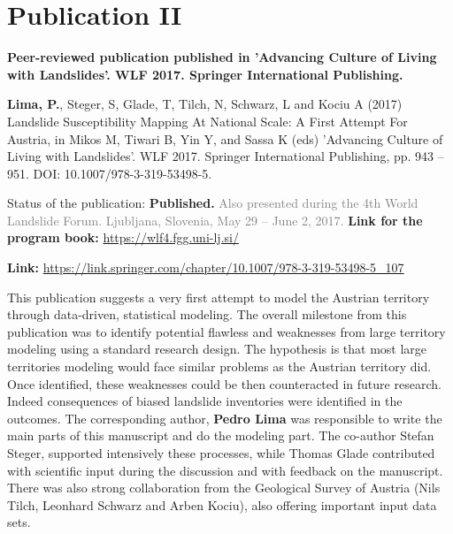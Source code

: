 \chapter{Publication II}\label{public_II} 
\textbf{Peer-reviewed publication published in 'Advancing Culture of Living with Landslides'. WLF 2017. Springer International Publishing.}
\vspace{5mm} %

\textbf{Lima, P.}, Steger, S, Glade, T, Tilch, N, Schwarz, L and Kociu A (2017) Landslide Susceptibility Mapping At National Scale: A First Attempt For Austria, in  Mikos M, Tiwari B, Yin Y, and Sassa K (eds) 'Advancing Culture of Living with Landslides'. WLF 2017. Springer International Publishing, pp. 943 – 951. DOI: 10.1007/978-3-319-53498-5. 

\vspace{5mm} %

Status of the publication: \textbf{Published.} \textcolor{gray}{Also presented during the 4th World Landslide Forum. Ljubljana, Slovenia, May 29 – June 2, 2017.} \textbf{Link for the program book:} \href{https://wlf4.fgg.uni-lj.si/wp-content/uploads/2017/05/WLF4-Local-Proceedings-and-Programme-with-posters.pdf}{https://wlf4.fgg.uni-lj.si/}\par
\vspace{5mm} %
\textbf{Link:} \href{https://link.springer.com/chapter/10.1007/978-3-319-53498-5_107}{https://link.springer.com/chapter/10.1007/978-3-319-53498-5_107} \par

\vspace{5mm} %
This publication suggests a very first attempt to model the Austrian territory through data-driven, statistical modeling. The overall milestone from this publication was to identify potential flawless and weaknesses from large territory modeling using a standard research design. The hypothesis is that most large territories modeling would face similar problems as the Austrian territory did. Once identified, these weaknesses could be then counteracted in future research. Indeed consequences of biased landslide inventories were identified in the outcomes. The corresponding author, \textbf{Pedro Lima} was responsible to write the main parts of this manuscript and do the modeling part. The co-author Stefan Steger, supported intensively these processes, while Thomas Glade contributed with scientific input during the discussion and with feedback on the manuscript. There was also strong collaboration from the Geological Survey of Austria (Nils Tilch, Leonhard Schwarz and Arben Kociu), also offering important input data sets.




